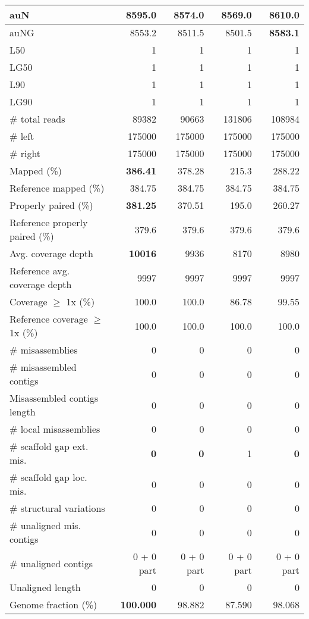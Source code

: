 \documentclass[12pt,a4paper]{article}
\begin{document}
\begin{table}[ht]
\begin{center}
\begin{tabular}{|l*{4}{|r}|}
auN & 8595.0 & 8574.0 & 8569.0 & {\bf 8610.0} \\ \hline
auNG & 8553.2 & 8511.5 & 8501.5 & {\bf 8583.1} \\ \hline
L50 & 1 & 1 & 1 & 1 \\ \hline
LG50 & 1 & 1 & 1 & 1 \\ \hline
L90 & 1 & 1 & 1 & 1 \\ \hline
LG90 & 1 & 1 & 1 & 1 \\ \hline
\# total reads & 89382 & 90663 & 131806 & 108984 \\ \hline
\# left & 175000 & 175000 & 175000 & 175000 \\ \hline
\# right & 175000 & 175000 & 175000 & 175000 \\ \hline
Mapped (\%) & {\bf 386.41} & 378.28 & 215.3 & 288.22 \\ \hline
Reference mapped (\%) & 384.75 & 384.75 & 384.75 & 384.75 \\ \hline
Properly paired (\%) & {\bf 381.25} & 370.51 & 195.0 & 260.27 \\ \hline
Reference properly paired (\%) & 379.6 & 379.6 & 379.6 & 379.6 \\ \hline
Avg. coverage depth & {\bf 10016} & 9936 & 8170 & 8980 \\ \hline
Reference avg. coverage depth & 9997 & 9997 & 9997 & 9997 \\ \hline
Coverage $\geq$ 1x (\%) & 100.0 & 100.0 & 86.78 & 99.55 \\ \hline
Reference coverage $\geq$ 1x (\%) & 100.0 & 100.0 & 100.0 & 100.0 \\ \hline
\# misassemblies & 0 & 0 & 0 & 0 \\ \hline
\# misassembled contigs & 0 & 0 & 0 & 0 \\ \hline
Misassembled contigs length & 0 & 0 & 0 & 0 \\ \hline
\# local misassemblies & 0 & 0 & 0 & 0 \\ \hline
\# scaffold gap ext. mis. & {\bf 0} & {\bf 0} & 1 & {\bf 0} \\ \hline
\# scaffold gap loc. mis. & 0 & 0 & 0 & 0 \\ \hline
\# structural variations & 0 & 0 & 0 & 0 \\ \hline
\# unaligned mis. contigs & 0 & 0 & 0 & 0 \\ \hline
\# unaligned contigs & 0 + 0 part & 0 + 0 part & 0 + 0 part & 0 + 0 part \\ \hline
Unaligned length & 0 & 0 & 0 & 0 \\ \hline
Genome fraction (\%) & {\bf 100.000} & 98.882 & 87.590 & 98.068 \\ \hline

\end{tabular}
\end{center}
\end{table}
\end{document}

